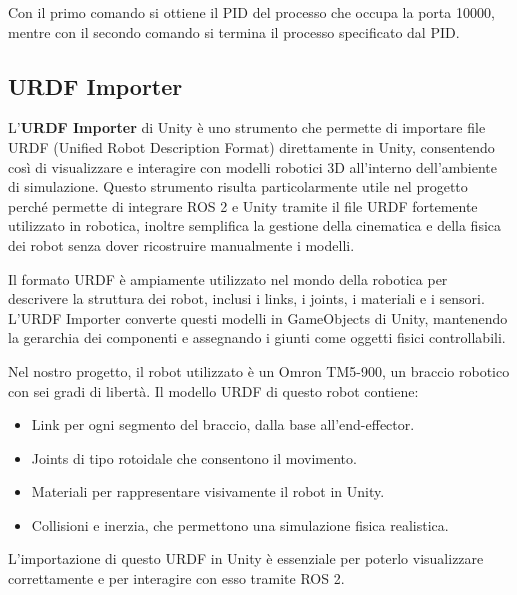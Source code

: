 \documentclass[11pt]{report}
\begin{document}
Con il primo comando si ottiene il PID del processo che occupa la porta 10000, mentre con il secondo comando si termina il processo specificato dal PID.


\subsection{URDF Importer}
\label{sec:urdf_importer}
L'\textbf{URDF Importer} \cite{URDF-Importer} di Unity è uno strumento che permette di importare file URDF (Unified Robot Description Format) direttamente in Unity, consentendo così di visualizzare e interagire con modelli robotici 3D all'interno dell'ambiente di simulazione. Questo strumento risulta particolarmente utile nel progetto perché permette di integrare ROS 2 e Unity tramite il file URDF fortemente utilizzato in robotica, inoltre semplifica la gestione della cinematica e della fisica dei robot senza dover ricostruire manualmente i modelli.

Il formato URDF è ampiamente utilizzato nel mondo della robotica per descrivere la struttura dei robot, inclusi i links, i joints, i materiali e i sensori. L'URDF Importer converte questi modelli in GameObjects di Unity, mantenendo la gerarchia dei componenti e assegnando i giunti come oggetti fisici controllabili.

Nel nostro progetto, il robot utilizzato è un Omron TM5-900, un braccio robotico con sei gradi di libertà. Il modello URDF di questo robot contiene:
\begin{itemize}
    \item Link per ogni segmento del braccio, dalla base all'end-effector.
    \item Joints di tipo rotoidale che consentono il movimento.
    \item Materiali per rappresentare visivamente il robot in Unity.
    \item Collisioni e inerzia, che permettono una simulazione fisica realistica.
\end{itemize}

L'importazione di questo URDF in Unity è essenziale per poterlo visualizzare correttamente e per interagire con esso tramite ROS 2.
\end{document}
